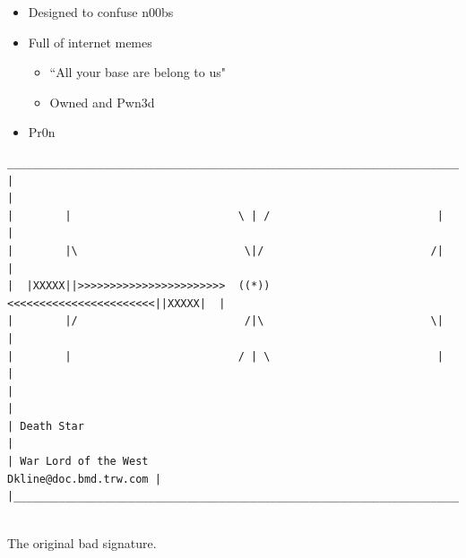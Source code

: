 \documentclass[a4paper,landscape,headrule,footrule,xetex]{foils}
\begin{document}

\begin{itemize}
\item Designed to confuse n00bs
\item Full of internet memes
  \begin{itemize}
  \item ``All your base are belong to us"
  \item Owned and Pwn3d
  \end{itemize}
\item  Pr0n
\end{itemize}


\begin{flushleft}
  \begin{footnotesize}
\begin{verbatim}
__________________________________________________________________________
|                                                                           |
|        |                          \ | /                          |        |
|        |\                          \|/                          /|        |
|  |XXXXX||>>>>>>>>>>>>>>>>>>>>>>>  ((*))  <<<<<<<<<<<<<<<<<<<<<<<||XXXXX|  |
|        |/                          /|\                          \|        |
|        |                          / | \                          |        |
|                                                                           |
| Death Star                                                                |
| War Lord of the West                               Dkline@doc.bmd.trw.com |
|___________________________________________________________________________|
 
\end{verbatim}
  \end{footnotesize}
\end{flushleft}

The original bad signature.
\end{document}
